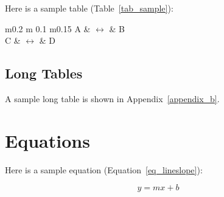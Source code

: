 Here is a sample table (Table~\ref{tab_sample}):

\begin{table}[ht]
	\centering
	\begin{tabular}{ m{} m {0.1\textwidth} m{0.15\textwidth} }
		\toprule
		A & $\longleftrightarrow$ & B \\
		C & $\longleftrightarrow$ & D \\
		\bottomrule
	\end{tabular}
	\caption{A sample table}
	\label{tab_sample}
\end{table}

\subsection{Long Tables}
A sample long table is shown in Appendix~\ref{appendix_b}.

\section{Equations}

Here is a sample equation (Equation~\ref{eq_lineslope}):

\begin{equation} \label{eq_lineslope}
	y = mx + b
\end{equation}
